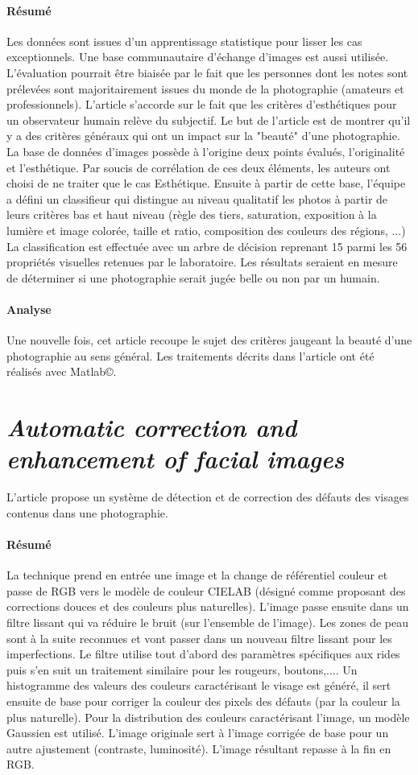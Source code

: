 \documentclass[11pt, french]{report-rd-info}
\begin{document}
\paragraph{Résumé}
Les données sont issues d'un apprentissage statistique pour lisser les cas exceptionnels. Une base communautaire d'échange d'images est aussi utilisée. L'évaluation pourrait être biaisée par le fait que les personnes dont les notes sont prélevées sont majoritairement issues du monde de la photographie (amateurs et professionnels). L'article s'accorde sur le fait que les critères d'esthétiques pour un observateur humain relève du subjectif. Le but de l'article est de montrer qu'il y a des critères généraux qui ont un impact sur la "beauté" d'une photographie. La base de données d'images possède à l'origine deux points évalués, l'originalité et l'esthétique. Par soucis de corrélation de ces deux éléments, les auteurs ont choisi de ne traiter que le cas Esthétique.
Ensuite à partir de cette base, l'équipe a défini un classifieur qui distingue au niveau qualitatif les photos à partir de leurs critères bas et haut niveau (règle des tiers, saturation, exposition à la lumière et image colorée, taille et ratio, composition des couleurs des régions, ...)
La classification est effectuée avec un arbre de décision reprenant 15 parmi les 56 propriétés visuelles retenues par le laboratoire. Les résultats seraient en mesure de déterminer si une photographie serait jugée belle ou non par un humain.
\paragraph{Analyse}
Une nouvelle fois, cet article recoupe le sujet des critères jaugeant la beauté d'une photographie au sens général. Les traitements décrits dans l’article ont été réalisés avec Matlab\copyright.
\section{\emph{Automatic correction and enhancement of facial images}}
L'article \cite{Konoplev2012} propose un système de détection et de correction des défauts des visages contenus dans une photographie.
\paragraph{Résumé}
La technique prend en entrée une image et la change de référentiel couleur et passe de RGB vers le modèle de couleur CIELAB (désigné comme proposant des corrections douces et des couleurs plus naturelles). L'image passe ensuite dans un filtre lissant qui va réduire le bruit (sur l’ensemble de l’image). Les zones de peau sont à la suite reconnues et vont passer dans un nouveau filtre lissant pour les imperfections.
Le filtre utilise tout d'abord des paramètres spécifiques aux rides puis s'en suit un traitement similaire pour les rougeurs, boutons,.... Un histogramme des valeurs des couleurs caractérisant le visage est généré, il sert ensuite de base pour corriger la couleur des pixels des défauts (par la couleur la plus naturelle). Pour la distribution des couleurs caractérisant l'image, un modèle Gaussien est utilisé. L’image originale sert à l'image corrigée de base pour un autre ajustement (contraste, luminosité). L'image résultant repasse à la fin en RGB.
\end{document}
